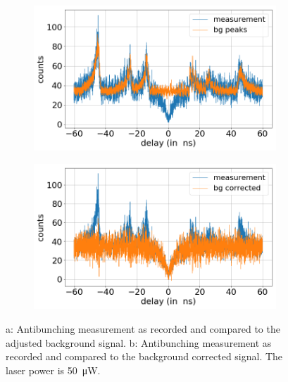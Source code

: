 \begin{figure}[!ht]
    \centering
    \begin{subfigure}{0.47\textwidth}
        \centering
        \includegraphics[width=1.0\textwidth]{img/output_t2/50.0muW_bg_peaks.png}
    		\caption{}
    \end{subfigure}
    \begin{subfigure}{0.47\textwidth}
        \centering
        \includegraphics[width=\textwidth]{img/output_t2/50.0muW_bg_vgl.png}
        \caption{}
    \end{subfigure}
    \caption{a: Antibunching measurement as recorded and compared to the adjusted background signal. b: Antibunching measurement as recorded and compared to the background corrected signal. The laser power is \SI{50}{\micro W}.} %
\end{figure}
